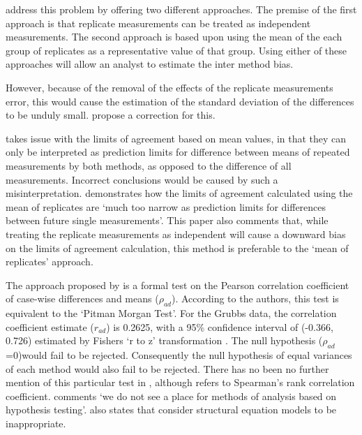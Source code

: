 \documentclass[12pt, a4paper]{report}
\begin{document}
\citet*{BA86} address this problem by offering two different
approaches. The premise of the first approach is that replicate
measurements can be treated as independent measurements. The
second approach is based upon using the mean of the each group of
replicates as a representative value of that group. Using either
of these approaches will allow an analyst to estimate the inter
method bias.


However, because of the removal of the effects of the replicate
measurements error, this would cause the estimation of the
standard deviation of the differences to be unduly small.
\citet*{BA86} propose a correction for this.

\citet{BXC2008} takes issue with the limits of agreement based on
mean values, in that they can only be interpreted as prediction
limits for difference between means of repeated measurements by
both methods, as opposed to the difference of all measurements.
Incorrect conclusions would be caused by such a misinterpretation.
\citet{BXC2008} demonstrates how the limits of agreement
calculated using the mean of replicates are `much too narrow as
prediction limits for differences between future single
measurements'. This paper also comments that, while treating the
replicate measurements as independent will cause a downward bias
on the limits of agreement calculation, this method is preferable
to the `mean of replicates' approach.

The approach proposed by \citet{BA83} is a formal test on the
Pearson correlation coefficient of case-wise differences and means
($\rho_{ad}$). According to the authors, this test is equivalent
to the `Pitman Morgan Test'. For the Grubbs data, the correlation
coefficient estimate ($r_{ad}$) is 0.2625, with a 95\% confidence
interval of (-0.366, 0.726) estimated by Fishers `r to z'
transformation \citep*{Cohen}. The null hypothesis ($\rho_{ad}$
=0)would fail to be rejected. Consequently the null hypothesis of
equal variances of each method would also fail to be rejected.
There has no been no further mention of this particular test in
\citet{BA86}, although \citet{BA99} refers to Spearman's rank
correlation coefficient. \citet{BA99} comments `we do not see a
place for methods of analysis based on hypothesis testing'.
\citet{BA99} also states that consider structural equation models
to be inappropriate.
\end{document}

